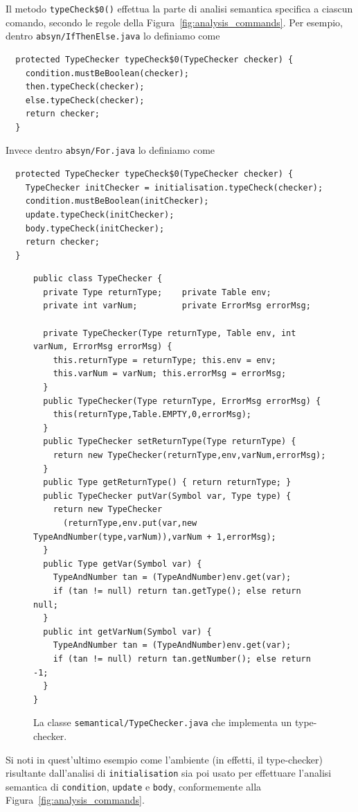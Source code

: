 Il metodo \texttt{typeCheck\$0()} effettua la parte di analisi semantica
specifica a ciascun comando, secondo le regole della
Figura~\ref{fig:analysis_commands}. Per esempio, dentro
\texttt{absyn/IfThenElse.java} lo definiamo come
%
\begin{verbatim}
  protected TypeChecker typeCheck$0(TypeChecker checker) {
    condition.mustBeBoolean(checker);
    then.typeCheck(checker);
    else.typeCheck(checker);
    return checker;
  }
\end{verbatim}
Invece dentro \texttt{absyn/For.java} lo definiamo come
%
\begin{verbatim}
  protected TypeChecker typeCheck$0(TypeChecker checker) {
    TypeChecker initChecker = initialisation.typeCheck(checker);
    condition.mustBeBoolean(initChecker);
    update.typeCheck(initChecker);
    body.typeCheck(initChecker);
    return checker;
  }
\end{verbatim}
\begin{figure}[t]
{\small
\begin{verbatim}
public class TypeChecker {
  private Type returnType;    private Table env;   
  private int varNum;         private ErrorMsg errorMsg;

  private TypeChecker(Type returnType, Table env, int varNum, ErrorMsg errorMsg) {
    this.returnType = returnType; this.env = env;
    this.varNum = varNum; this.errorMsg = errorMsg;
  }
  public TypeChecker(Type returnType, ErrorMsg errorMsg) {
    this(returnType,Table.EMPTY,0,errorMsg);
  }
  public TypeChecker setReturnType(Type returnType) {
    return new TypeChecker(returnType,env,varNum,errorMsg);
  }
  public Type getReturnType() { return returnType; }
  public TypeChecker putVar(Symbol var, Type type) {
    return new TypeChecker
      (returnType,env.put(var,new TypeAndNumber(type,varNum)),varNum + 1,errorMsg);
  }
  public Type getVar(Symbol var) {
    TypeAndNumber tan = (TypeAndNumber)env.get(var);
    if (tan != null) return tan.getType(); else return null;
  }
  public int getVarNum(Symbol var) {
    TypeAndNumber tan = (TypeAndNumber)env.get(var);
    if (tan != null) return tan.getNumber(); else return -1;
  }
}
\end{verbatim}
}
\caption{La classe \texttt{semantical/TypeChecker.java} che implementa un type-checker.}
  \label{fig:semantical.TypeChecker}
\end{figure}
%
Si noti in quest'ultimo esempio come l'ambiente (in effetti, il type-checker)
risultante dall'analisi di \texttt{initialisation} sia poi usato per effettuare
l'analisi semantica di \texttt{condition}, \texttt{update} e \texttt{body},
conformemente alla Figura~\ref{fig:analysis_commands}.

